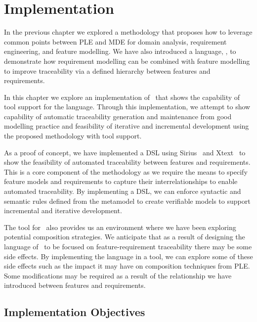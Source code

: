 \chapter{Implementation}

In the previous chapter we explored a methodology that proposes how to leverage common points between \acf{PLE} and \acf{MDE} for domain analysis, requirement engineering, and feature modelling. We have also introduced a language, \tool, to demonstrate how requirement modelling can be combined with feature modelling to improve traceability via a defined hierarchy between features and requirements.

In this chapter we explore an implementation of \tool\ that shows the capability of tool support for the language. Through this implementation, we attempt to show capability of automatic traceability generation and maintenance from good modelling practice and feasibility of iterative and incremental development using the proposed methodology with tool support.

As a proof of concept, we have implemented a \ac{DSL} using Sirius~\cite{viyovic2014sirius} and Xtext~\cite{eysholdt2010xtext} to show the feasibility of automated traceability between features and requirements. This is a core component of the methodology as we require the means to specify feature models and requirements to capture their interrelationships to enable automated traceability. By implementing a \ac{DSL}, we can enforce syntactic and semantic rules defined from the metamodel to create verifiable models to support incremental and iterative development.

The tool for \tool\ also provides us an environment where we have been exploring potential composition strategies. We anticipate that as a result of designing the language of \tool\ to be focused on feature-requirement traceability there may be some side effects. By implementing the language in a tool, we can explore some of these side effects such as the impact it may have on composition techniques from \ac{PLE}. Some modifications may be required as a result of the relationship we have introduced between features and requirements. 


\section{Implementation Objectives}

